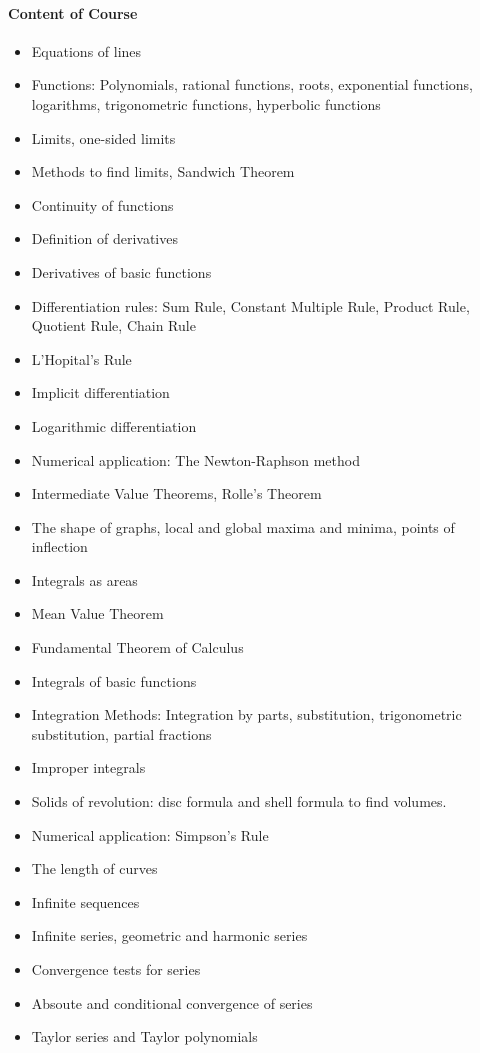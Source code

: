 \paragraph{Content of Course}
\begin{itemize}
\item Equations of lines
\item Functions: Polynomials, rational functions, roots, exponential functions, logarithms, trigonometric
functions, hyperbolic functions
\item Limits, one-sided limits
\item Methods to find limits, Sandwich Theorem
\item Continuity of functions
\item Definition of derivatives
\item Derivatives of basic functions
\item Differentiation rules: Sum Rule, Constant Multiple Rule, Product Rule, Quotient Rule, Chain Rule
\item L'Hopital's Rule
\item Implicit differentiation
\item Logarithmic differentiation
\item Numerical application: The Newton-Raphson method
\item Intermediate Value Theorems, Rolle's Theorem
\item The shape of graphs, local and global maxima and minima, points of inflection
\item Integrals as areas
\item Mean Value Theorem
\item Fundamental Theorem of Calculus
\item Integrals of basic functions
\item Integration Methods: Integration by parts, substitution, trigonometric substitution, partial fractions
\item Improper integrals
\item Solids of revolution: disc formula and shell formula to find volumes.
\item Numerical application: Simpson's Rule
\item The length of curves
\item Infinite sequences
\item Infinite series, geometric and harmonic series
\item Convergence tests for series
\item Absoute and conditional convergence of series
\item Taylor series and Taylor polynomials
\end{itemize}

